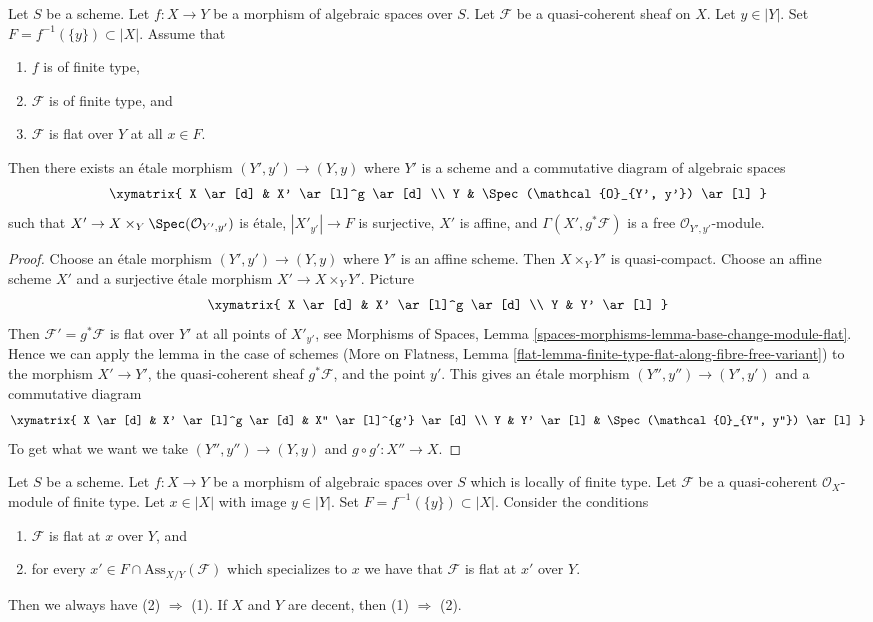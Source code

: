 \begin{lemma}
\label{lemma-finite-type-flat-along-fibre-free-variant}
Let $S$ be a scheme. Let $f : X \to Y$ be a morphism of algebraic spaces
over $S$. Let $\mathcal{F}$ be a quasi-coherent sheaf on $X$.
Let $y \in |Y|$. Set $F = f^{-1}(\{y\}) \subset |X|$. Assume that
\begin{enumerate}
\item $f$ is of finite type,
\item $\mathcal{F}$ is of finite type, and
\item $\mathcal{F}$ is flat over $Y$ at all $x \in F$.
\end{enumerate}
Then there exists an \'etale morphism $(Y', y') \to (Y, y)$
where $Y'$ is a scheme and a commutative diagram of algebraic spaces
$$
\xymatrix{
X \ar[d] & X' \ar[l]^g \ar[d] \\
Y & \Spec(\mathcal{O}_{Y', y'}) \ar[l]
}
$$
such that $X' \to X \times_Y \Spec(\mathcal{O}_{Y', y'})$
is \'etale, $|X'_{y'}| \to F$ is surjective, $X'$ is affine,
and $\Gamma(X', g^*\mathcal{F})$ is a free $\mathcal{O}_{Y', y'}$-module.
\end{lemma}

\begin{proof}
Choose an \'etale morphism $(Y', y') \to (Y, y)$ where $Y'$ is an
affine scheme. Then $X \times_Y Y'$ is quasi-compact.
Choose an affine scheme $X'$ and a surjective \'etale morphism
$X' \to X \times_Y Y'$. Picture
$$
\xymatrix{
X \ar[d] & X' \ar[l]^g \ar[d] \\
Y & Y' \ar[l]
}
$$
Then $\mathcal{F}' = g^*\mathcal{F}$ is flat over $Y'$ at all
points of $X'_{y'}$, see Morphisms of Spaces, Lemma
\ref{spaces-morphisms-lemma-base-change-module-flat}.
Hence we can apply the lemma in the case of schemes
(More on Flatness, Lemma
\ref{flat-lemma-finite-type-flat-along-fibre-free-variant})
to the morphism
$X' \to Y'$, the quasi-coherent sheaf $g^*\mathcal{F}$, and the point $y'$.
This gives an \'etale morphism $(Y'', y'') \to (Y', y')$ and a commutative
diagram
$$
\xymatrix{
X \ar[d] & X' \ar[l]^g \ar[d] & X'' \ar[l]^{g'} \ar[d] \\
Y & Y' \ar[l] & \Spec(\mathcal{O}_{Y'', y''}) \ar[l]
}
$$
To get what we want we take $(Y'', y'') \to (Y, y)$
and $g \circ g' : X'' \to X$.
\end{proof}

\begin{theorem}
\label{theorem-check-flatness-at-associated-points}
Let $S$ be a scheme.
Let $f : X \to Y$ be a morphism of algebraic spaces over $S$
which is locally of finite type.
Let $\mathcal{F}$ be a quasi-coherent $\mathcal{O}_X$-module of finite type.
Let $x \in |X|$ with image $y \in |Y|$.
Set $F = f^{-1}(\{y\}) \subset |X|$.
Consider the conditions
\begin{enumerate}
\item $\mathcal{F}$ is flat at $x$ over $Y$, and
\item for every $x' \in F \cap \text{Ass}_{X/Y}(\mathcal{F})$ which
specializes to $x$ we have that $\mathcal{F}$ is flat at $x'$ over $Y$.
\end{enumerate}
Then we always have (2) $\Rightarrow$ (1). If $X$ and $Y$ are
decent, then (1) $\Rightarrow$ (2).
\end{theorem}

